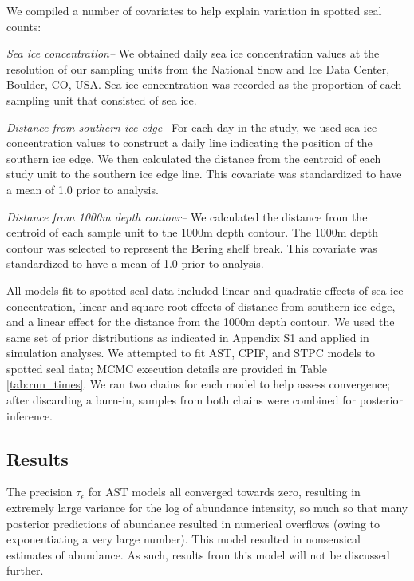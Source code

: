 \documentclass[12pt,fleqn]{article}
\begin{document}
\begin{flushleft}
\hspace{.5in}We compiled a number of covariates to help explain variation in spotted seal counts:

{\it Sea ice concentration--}  We obtained daily sea ice concentration values at the resolution of our sampling units from the National Snow and Ice Data Center, Boulder, CO, USA.  Sea ice concentration was recorded as the proportion of each sampling unit that consisted of sea ice.

{\it Distance from southern ice edge--}  For each day in the study, we used sea ice concentration values to construct a daily line indicating the position of the southern ice edge.  We then calculated the distance from the centroid of each study unit to the southern ice edge line.  This covariate was standardized to have a mean of 1.0 prior to analysis.

{\it Distance from 1000m depth contour--}  We calculated the distance from the centroid of each sample unit to the 1000m depth contour.  The 1000m depth contour was selected to represent the Bering shelf break.  This covariate was standardized to have a mean of 1.0 prior to analysis.

\hspace{.5in}All models fit to spotted seal data included linear and quadratic effects of sea ice concentration, linear and square root effects of distance from southern ice edge, and a linear effect for the distance from the 1000m depth contour.  We used the same set of prior distributions as indicated in Appendix S1 and applied in simulation analyses.  We attempted to fit AST, CPIF, and STPC models to spotted seal data; MCMC execution details are provided in Table \ref{tab:run_times}.  We ran two chains for each model to help assess convergence; after discarding a burn-in, samples from both chains were combined for posterior inference.


\subsection{Results}

The precision $\tau_\epsilon$ for AST models all converged towards zero, resulting in extremely large variance for the log of abundance intensity, so much so that many posterior predictions of abundance resulted in numerical overflows (owing to exponentiating a very large number).  This model resulted in nonsensical estimates of abundance.  As such, results from this model will not be discussed further.


\end{flushleft}
\end{document}

